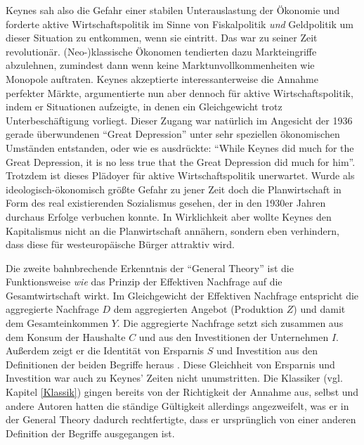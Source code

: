 Keynes sah also die Gefahr einer stabilen Unterauslastung der Ökonomie und forderte aktive Wirtschaftspolitik im Sinne von Fiskalpolitik \textit{und} Geldpolitik um dieser Situation zu entkommen, wenn sie eintritt. Das war zu seiner Zeit revolutionär. (Neo-)klassische Ökonomen tendierten dazu Markteingriffe abzulehnen, zumindest dann wenn keine Marktunvollkommenheiten wie Monopole auftraten. Keynes akzeptierte interessanterweise die Annahme perfekter Märkte, argumentierte nun aber dennoch für aktive Wirtschaftspolitik, indem er Situationen aufzeigte, in denen ein Gleichgewicht trotz Unterbeschäftigung vorliegt. Dieser Zugang war natürlich im Angesicht der 1936 gerade überwundenen "`Great Depression"' unter sehr speziellen ökonomischen Umständen entstanden, oder wie \textcite[S. 199]{Samuelson1946} es ausdrückte: "`While Keynes did much for the Great Depression, it is no less true that the Great Depression did much for him"'. Trotzdem ist dieses Plädoyer für aktive Wirtschaftspolitik unerwartet. Wurde als ideologisch-ökonomisch größte Gefahr zu jener Zeit doch die Planwirtschaft in Form des real existierenden Sozialismus gesehen, der in den 1930er Jahren durchaus Erfolge verbuchen konnte. In Wirklichkeit aber wollte Keynes den Kapitalismus nicht an die Planwirtschaft annähern, sondern eben verhindern, dass diese für westeuropäische Bürger attraktiv wird.

Die zweite bahnbrechende Erkenntnis der "`General Theory"' ist die Funktionsweise \textit{wie} das Prinzip der Effektiven Nachfrage auf die Gesamtwirtschaft wirkt. Im Gleichgewicht der Effektiven Nachfrage entspricht die aggregierte Nachfrage $D$ dem aggregierten Angebot (Produktion $Z$) und damit dem Gesamteinkommen $Y$. Die aggregierte Nachfrage setzt sich zusammen aus dem Konsum der Haushalte $C$ und aus den Investitionen der Unternehmen $I$. Außerdem zeigt er die Identität von Ersparnis $S$ und Investition aus den Definitionen der beiden Begriffe heraus \parencite[S. 63]{Keynes1936}. Diese Gleichheit von Ersparnis und Investition war auch zu Keynes' Zeiten nicht unumstritten. Die Klassiker (vgl. Kapitel \ref{Klassik}) gingen bereits von der Richtigkeit der Annahme aus, \textcite{Keynes1930} selbst und andere Autoren hatten die ständige Gültigkeit allerdings angezweifelt, was er in der General Theory \parencite[S. 74ff]{Keynes1936} dadurch rechtfertigte, dass er ursprünglich von einer anderen Definition der Begriffe ausgegangen ist.

